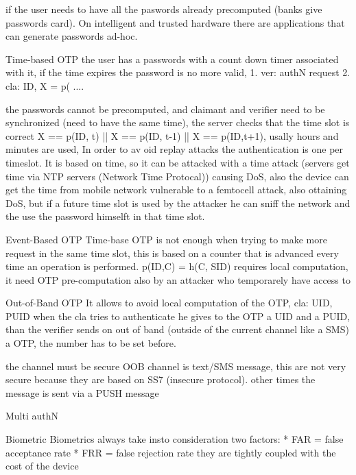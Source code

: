 \documentclass[12pt]{article}
\begin{document}
if the user needs to have all the paswords already precomputed (banks give passwords card). On intelligent and trusted hardware there are applications that can generate passwords ad-hoc.



Time-based OTP
the user has a passwords with a count down timer associated with it, if the time expires the password is no more valid,
1. ver: authN request
2. cla: ID, X = p(
....

the passwords cannot be precomputed, and claimant and verifier need to be synchronized (need to have the same time),
the server checks that the time slot is correct
X == p(ID, t) || X == p(ID, t-1) || X == p(ID,t+1), usally hours and minutes are used, 
In order to av oid replay attacks the authentication is one per timeslot.
It is based on time, so it can be attacked with a time attack (servers get time via NTP servers (Network Time Protocal)) causing DoS, also the device can get the time from mobile network vulnerable to a femtocell attack, also ottaining DoS, but if a future time slot is used by the attacker he can sniff the network and the use the password himselft in that time slot.




Event-Based OTP
Time-base OTP is not enough when trying to make more request in the same time slot, this is based on a counter that is advanced every time an operation is performed.
p(ID,C) = h(C, SID)
requires local computation, it need OTP pre-computation also by an attacker who temporarely have access to



Out-of-Band OTP
It allows to avoid local computation of the OTP,
cla: UID, PUID
when the cla tries to authenticate he gives to the OTP a UID and a PUID,
than the verifier sends on out of band (outside of the current channel like a SMS) a OTP, the number has to be set before.

the channel must be secure
OOB channel is text/SMS message, this are not very secure because they are based on SS7 (insecure protocol).
other times the message is sent via a PUSH message




Multi authN




Biometric
Biometrics always take insto consideration two factors:
* FAR = false acceptance rate
* FRR = false rejection rate
they are tightly coupled with the cost of the device
\end{document}
